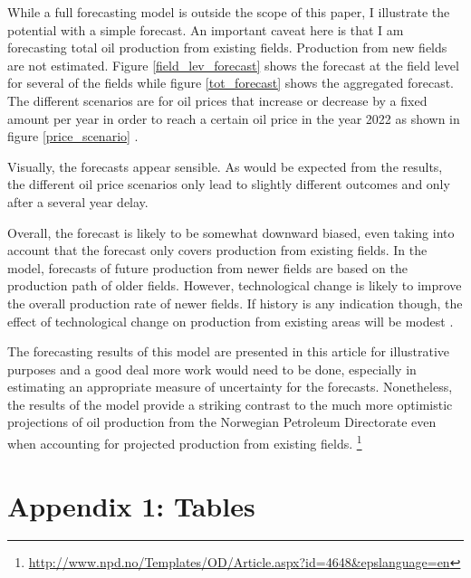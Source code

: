 \documentclass[12pt]{article}
\begin{document}
While a full forecasting model is outside the scope of this paper, I illustrate the potential with a simple forecast.  An important caveat here is that I am forecasting total oil production from existing fields.  Production from new fields are not estimated.  Figure \ref{field_lev_forecast} shows the forecast at the field level for several of the fields while figure \ref{tot_forecast} shows the aggregated forecast.  The different scenarios are for oil prices that increase or decrease by a fixed amount per year in order to reach a certain oil price in the year 2022 as shown in figure \ref{price_scenario} .  

Visually, the forecasts appear sensible.  As would be expected from the results, the different oil price scenarios only lead to slightly different outcomes and only after a several year delay.

Overall, the forecast is likely to be somewhat downward biased, even taking into account that the forecast only covers production from existing fields.  In the model, forecasts of future production from newer fields are based on the production path of older fields.  However, technological change is likely to improve the overall production rate of newer fields.  If history is any indication though, the effect of technological change on production from existing areas will be modest \citep{hamilton_oil_2012}.

The forecasting results of this model are presented in this article for illustrative purposes and a good deal more work would need to be done, especially in estimating an appropriate measure of uncertainty for the forecasts.  Nonetheless, the results of the model provide a striking contrast to the much more optimistic projections of oil production from the Norwegian Petroleum Directorate even when accounting for projected production from existing fields. \footnote{\url{http://www.npd.no/Templates/OD/Article.aspx?id=4648&epslanguage=en}}

\section{Appendix 1: Tables}
\end{document}
